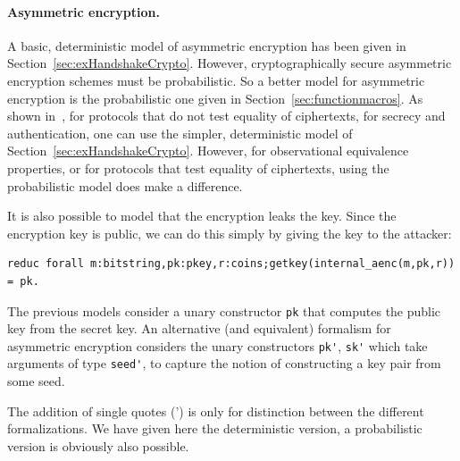 \documentclass{book}
\begin{document}
\paragraph{Asymmetric encryption.} A basic, deterministic model of asymmetric encryption has been given in Section~\ref{sec:exHandshakeCrypto}. However, cryptographically secure asymmetric encryption schemes must be probabilistic. So a better model for asymmetric encryption is the probabilistic one given in Section~\ref{sec:functionmacros}.
As shown in~\cite{Cortier06b}, for protocols that do not test equality of ciphertexts, for secrecy and authentication, one can use the simpler, deterministic model of Section~\ref{sec:exHandshakeCrypto}. However, for observational equivalence properties, or for protocols that test equality of ciphertexts, using the probabilistic model does make a difference.

It is also possible to model that the encryption leaks the key. Since the encryption key is public, we can do this simply by giving the key to the attacker:
\begin{lstlisting}[numbers=none]
reduc forall m:bitstring,pk:pkey,r:coins;getkey(internal_aenc(m,pk,r)) = pk.
\end{lstlisting}

The previous models consider a unary constructor \lstinline{pk} that computes the public key from the secret key.
An alternative (and equivalent) formalism for asymmetric encryption considers the unary constructors \lstinline{pk'}, \lstinline{sk'} which take arguments of type \lstinline{seed'}, to capture the notion of constructing a key pair from some seed.
%

%
The addition of single quotes (') is only for distinction between the different formalizations. We have given here the deterministic version, a probabilistic version is obviously also possible.
\end{document}
